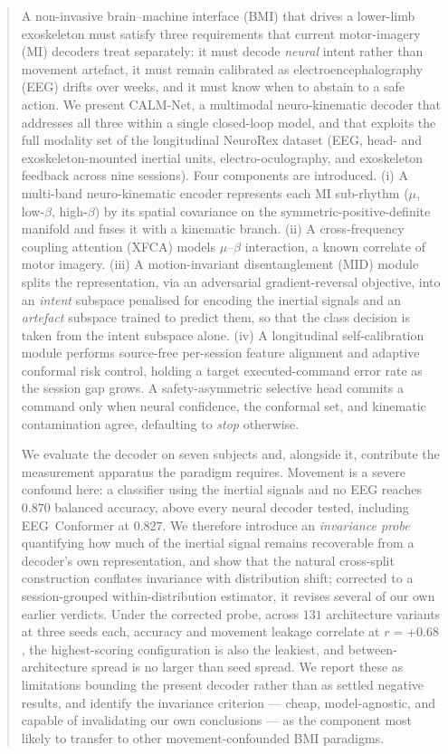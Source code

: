 \documentclass[conference]{IEEEtran}
\begin{document}
\begin{abstract}
A non-invasive brain--machine interface (BMI) that drives a lower-limb exoskeleton must
satisfy three requirements that current motor-imagery (MI) decoders treat separately: it
must decode \emph{neural} intent rather than movement artefact, it must remain calibrated
as electroencephalography (EEG) drifts over weeks, and it must know when to abstain to a
safe action. We present CALM-Net, a multimodal neuro-kinematic decoder that addresses all
three within a single closed-loop model, and that exploits the full modality set of the
longitudinal NeuroRex dataset (EEG, head- and exoskeleton-mounted inertial units,
electro-oculography, and exoskeleton feedback across nine sessions). Four components are
introduced. (i) A multi-band neuro-kinematic encoder represents each MI sub-rhythm
($\mu$, low-$\beta$, high-$\beta$) by its spatial covariance on the
symmetric-positive-definite manifold and fuses it with a kinematic branch. (ii) A
cross-frequency coupling attention (XFCA) models $\mu$--$\beta$ interaction, a known
correlate of motor imagery. (iii) A motion-invariant disentanglement (MID) module splits
the representation, via an adversarial gradient-reversal objective, into an \emph{intent}
subspace penalised for encoding the inertial signals and an \emph{artefact} subspace
trained to predict them, so that the class decision is taken from the intent subspace
alone. (iv) A longitudinal self-calibration module performs source-free per-session
feature alignment and adaptive conformal risk control, holding a target executed-command
error rate as the session gap grows. A safety-asymmetric selective head commits a command
only when neural confidence, the conformal set, and kinematic contamination agree,
defaulting to \emph{stop} otherwise.

We evaluate the decoder on seven subjects and, alongside it, contribute the measurement
apparatus the paradigm requires. Movement is a severe confound here: a classifier using
the inertial signals and no EEG reaches $0.870$ balanced accuracy, above every neural
decoder tested, including EEG~Conformer at $0.827$. We therefore introduce an
\emph{invariance probe} quantifying how much of the inertial signal remains recoverable
from a decoder's own representation, and show that the natural cross-split construction
conflates invariance with distribution shift; corrected to a session-grouped
within-distribution estimator, it revises several of our own earlier verdicts. Under the
corrected probe, across $131$ architecture variants at three seeds each, accuracy and
movement leakage correlate at $r = +0.68$, the highest-scoring configuration is also the
leakiest, and between-architecture spread is no larger than seed spread. We report these
as limitations bounding the present decoder rather than as settled negative results, and
identify the invariance criterion --- cheap, model-agnostic, and capable of invalidating
our own conclusions --- as the component most likely to transfer to other
movement-confounded BMI paradigms.
\end{abstract}
\end{document}

